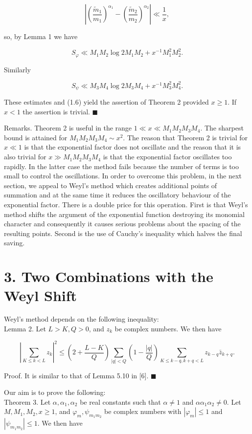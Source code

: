 \documentclass[10pt]{article}
\newcommand{\proofend}{\hfill\(\blacksquare\)}
\begin{document}
$$
\left|\left(\frac{\tilde{m}_{1}}{m_{1}}\right)^{\alpha_{1}}-\left(\frac{\tilde{m}_{2}}{m_{2}}\right)^{\alpha_{2}}\right| \ll \frac{1}{x},
$$

so, by Lemma 1 we have

$$
S_{\varphi} \ll M_{1} M_{2} \log 2 M_{1} M_{2}+x^{-1} M_{1}^{2} M_{2}^{2} .
$$

Similarly

$$
S_{\psi} \ll M_{3} M_{4} \log 2 M_{3} M_{4}+x^{-1} M_{3}^{2} M_{4}^{2} .
$$

These estimates and (1.6) yield the assertion of Theorem 2 provided $x \geqslant 1$. If $x<1$ the assertion is trivial. \proofend

Remarks. Theorem 2 is useful in the range $1 \ll x \ll M_{1} M_{2} M_{3} M_{4}$. The sharpest bound is attained for $M_{1} M_{2} M_{3} M_{4} \sim x^{2}$. The reason that Theorem 2 is trivial for $x \ll 1$ is that the exponential factor does not oscillate and the reason that it is also trivial for $x \gg M_{1} M_{2} M_{3} M_{4}$ is that the exponential factor oscillates too rapidly. In the latter case the method fails because the number of terms is too small to control the oscillations. In order to overcome this problem, in the next section, we appeal to Weyl's method which creates additional points of summation and at the same time it reduces the oscillatory behaviour of the exponential factor. There is a double price for this operation. First is that Weyl's method shifts the argument of the exponential function destroying its monomial character and consequently it causes serious problems about the spacing of the resulting points. Second is the use of Cauchy's inequality which halves the final saving.

\section*{3. Two Combinations with the Weyl Shift}
Weyl's method depends on the following inequality:\\
Lemma 2. Let $L>K, Q>0$, and $z_{k}$ be complex numbers. We then have

$$
\left|\sum_{K \leqslant k<L} z_{k}\right|^{2} \leqslant\left(2+\frac{L-K}{Q}\right) \sum_{|q|<Q}\left(1-\frac{|q|}{Q}\right) \sum_{K \leqslant k-q, k+q<L} z_{k-q} \bar{z}_{k+q} .
$$

Proof. It is similar to that of Lemma 5.10 in [6]. \proofend

Our aim is to prove the following:\\
Theorem 3. Let $\alpha, \alpha_{1}, \alpha_{2}$ be real constants such that $\alpha \neq 1$ and $\alpha \alpha_{1} \alpha_{2} \neq 0$. Let $M, M_{1}, M_{2}, x \geqslant 1$, and $\varphi_{m}, \psi_{m_{1} m_{2}}$ be complex numbers with $\left|\varphi_{m}\right| \leqslant 1$ and $\left|\psi_{m_{1} m_{2}}\right| \leqslant 1$. We then have
\end{document}

